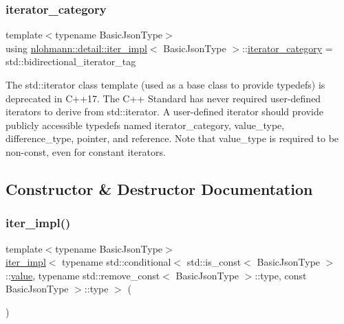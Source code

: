 \subsubsection{\texorpdfstring{iterator\+\_\+category}{iterator\_category}}
{\footnotesize\ttfamily template$<$typename Basic\+Json\+Type$>$ \\
using \hyperlink{classnlohmann_1_1detail_1_1iter__impl}{nlohmann\+::detail\+::iter\+\_\+impl}$<$ Basic\+Json\+Type $>$\+::\hyperlink{classnlohmann_1_1detail_1_1iter__impl_ad9e091f5c70b34b5b1abc1ab15fd9106}{iterator\+\_\+category} =  std\+::bidirectional\+\_\+iterator\+\_\+tag}

The std\+::iterator class template (used as a base class to provide typedefs) is deprecated in C++17. The C++ Standard has never required user-\/defined iterators to derive from std\+::iterator. A user-\/defined iterator should provide publicly accessible typedefs named iterator\+\_\+category, value\+\_\+type, difference\+\_\+type, pointer, and reference. Note that value\+\_\+type is required to be non-\/const, even for constant iterators. 

\subsection{Constructor \& Destructor Documentation}
\mbox{\label{classnlohmann_1_1detail_1_1iter__impl_a19aa457f9c4af1b7e3af59839132cc5c}} 
\subsubsection{\texorpdfstring{iter\+\_\+impl()}{iter\_impl()}\hspace{0.1cm}{\footnotesize\ttfamily [1/4]}}
{\footnotesize\ttfamily template$<$typename Basic\+Json\+Type$>$ \\
\hyperlink{classnlohmann_1_1detail_1_1iter__impl}{iter\+\_\+impl}$<$ typename std\+::conditional$<$ std\+::is\+\_\+const$<$ Basic\+Json\+Type $>$\+::\hyperlink{classnlohmann_1_1detail_1_1iter__impl_ab447c50354c6611fa2ae0100ac17845c}{value}, typename std\+::remove\+\_\+const$<$ Basic\+Json\+Type $>$\+::type, const Basic\+Json\+Type $>$\+::type $>$ (\begin{DoxyParamCaption}{ }\end{DoxyParamCaption})\hspace{0.3cm}{\ttfamily [default]}}



